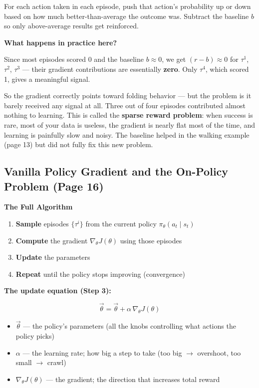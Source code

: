 For each action taken in each episode, push that action's probability up or down based on how much
better-than-average the outcome was. Subtract the baseline $b$ so only above-average results get
reinforced.

\textbf{What happens in practice here?}

Since most episodes scored 0 and the baseline $b \approx 0$, we get $(r - b) \approx 0$ for
$\tau^1$, $\tau^2$, $\tau^3$ --- their gradient contributions are essentially \textbf{zero}. Only
$\tau^4$, which scored 1, gives a meaningful signal.

So the gradient correctly points toward folding behavior --- but the problem is it barely received
any signal at all. Three out of four episodes contributed almost nothing to learning. This is called
the \textbf{sparse reward problem}: when success is rare, most of your data is useless, the
gradient is nearly flat most of the time, and learning is painfully slow and noisy. The baseline
helped in the walking example (page 13) but did not fully fix this new problem.

\subsection{Vanilla Policy Gradient and the On-Policy Problem (Page 16)}

\textbf{The Full Algorithm}

\begin{enumerate}
  \item \textbf{Sample} episodes $\{\tau^i\}$ from the current policy $\pi_\theta(a_t \mid s_t)$
  \item \textbf{Compute} the gradient $\nabla_\theta J(\theta)$ using those episodes
  \item \textbf{Update} the parameters
  \item \textbf{Repeat} until the policy stops improving (convergence)
\end{enumerate}

\textbf{The update equation (Step 3):}

\[
\vec{\theta} = \vec{\theta} + \alpha\,\nabla_\theta J(\theta)
\]

\begin{itemize}
  \item $\vec{\theta}$ --- the policy's parameters (all the knobs controlling what actions the
    policy picks)
  \item $\alpha$ --- the learning rate; how big a step to take (too big $\to$ overshoot, too small
    $\to$ crawl)
  \item $\nabla_\theta J(\theta)$ --- the gradient; the direction that increases total reward
\end{itemize}

